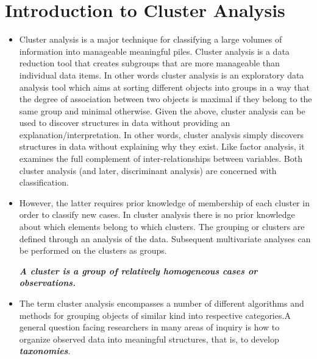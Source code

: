 






\tableofcontents
\newpage

\section{Introduction to Cluster Analysis}


\begin{itemize}
\item Cluster analysis is a major technique for classifying a large volumes of information into
manageable meaningful piles. Cluster analysis is a data reduction tool that creates subgroups that are
more manageable than individual data items. In other words cluster analysis is an exploratory data analysis tool which aims at sorting different objects into groups in a way that the degree of association between two objects is maximal if they belong to the same group and minimal otherwise. Given the above, cluster analysis can be used to discover structures in data without providing an explanation/interpretation. In other words, cluster analysis simply discovers structures in data without explaining why they exist. Like factor analysis, it examines the full complement
of inter-relationships between variables. Both cluster analysis (and later, discriminant
analysis) are concerned with classification.

\item However, the latter requires prior knowledge of membership of each cluster in order to classify new cases. In cluster analysis
there is no prior knowledge about which elements belong to which clusters. The grouping
or clusters are defined through an analysis of the data. Subsequent multivariate analyses
can be performed on the clusters as groups.

\textbf{\textit{A cluster is a group of relatively homogeneous cases or observations.}}

\item 
The term cluster analysis encompasses a number of different algorithms and methods for grouping objects of similar kind into respective categories.A general question facing researchers in many areas of inquiry is how to organize observed data into meaningful structures, that is, to develop \textbf{\emph{taxonomies}}.
\end{itemize}
